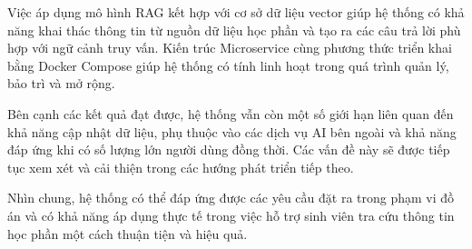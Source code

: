 \documentclass[../DoAn.tex]{subfiles}
\begin{document}
Việc áp dụng mô hình RAG kết hợp với cơ sở dữ liệu vector giúp hệ thống có khả năng khai thác thông tin từ nguồn dữ liệu học phần và tạo ra các câu trả lời phù hợp với ngữ cảnh truy vấn. Kiến trúc Microservice cùng phương thức triển khai bằng Docker Compose giúp hệ thống có tính linh hoạt trong quá trình quản lý, bảo trì và mở rộng.

Bên cạnh các kết quả đạt được, hệ thống vẫn còn một số giới hạn liên quan đến khả năng cập nhật dữ liệu, phụ thuộc vào các dịch vụ AI bên ngoài và khả năng đáp ứng khi có số lượng lớn người dùng đồng thời. Các vấn đề này sẽ được tiếp tục xem xét và cải thiện trong các hướng phát triển tiếp theo.

Nhìn chung, hệ thống có thể đáp ứng được các yêu cầu đặt ra trong phạm vi đồ án và có khả năng áp dụng thực tế trong việc hỗ trợ sinh viên tra cứu thông tin học phần một cách thuận tiện và hiệu quả.
\end{document}
